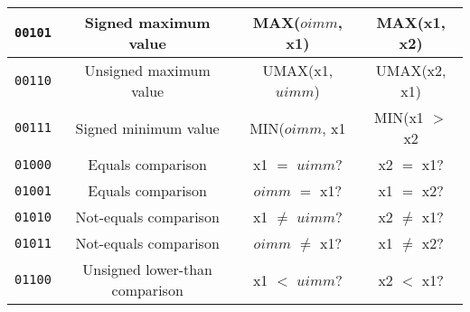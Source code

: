 \begin{center}
\begin{longtable}{|c|c|c|c|}
    \texttt{00101}                       &
    Signed maximum value                 &
    MAX($oimm$, x1)                      &
    MAX(x1, x2)                          \\ \hline
                                           
    \texttt{00110}                       &
    Unsigned maximum value               &
    UMAX(x1, $uimm$)                     &
    UMAX(x2, x1)                         \\ \hline

    \texttt{00111}                       &
    Signed minimum value                 &
    MIN($oimm$, x1                       &
    MIN(x1 $>$ x2                        \\ \hline

    \texttt{01000}                       &
    Equals comparison                    &
    x1 $=$ $uimm$?                       &
    x2 $=$ x1?                           \\ \hline

    \texttt{01001}                       &
    Equals comparison                    &
    $oimm$ $=$ x1?                       &
    x1 $=$ x2?                           \\ \hline

    \texttt{01010}                       &
    Not-equals comparison                &
    x1 $\ne$ $uimm$?                     &
    x2 $\ne$ x1?                         \\ \hline

    \texttt{01011}                       &
    Not-equals comparison                &
    $oimm$ $\ne$ x1?                     &
    x1 $\ne$ x2?                         \\ \hline

    \texttt{01100}                       &
    Unsigned lower-than comparison       &
    x1 $<$ $uimm$?                       &
    x2 $<$ x1?                           \\ \hline


\end{longtable}
\end{center}
